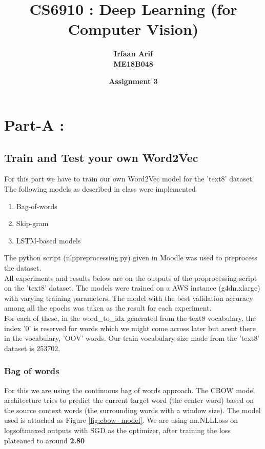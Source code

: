 \documentclass{article}
\title{CS6910 : Deep Learning (for Computer Vision)}
\author{\textbf{Irfaan Arif} \\ {\textbf{ME18B048}}}
\date{\textbf{Assignment 3}}
\begin{document}
\maketitle
\vspace{-1.6em}

\section{Part-A : }
\subsection*{Train and Test your own Word2Vec}

For this part we have to train our own Word2Vec model for the 'text8'  dataset. The following models as described in class were implemented
\begin{enumerate}[label=(\alph*),noitemsep]
    \item Bag-of-words
    \item Skip-gram
    \item LSTM-based models
\end{enumerate}
The python script (nlppreprocessing.py) given in Moodle was used to preprocess the dataset.\\

\noindent
 All experiments and results below are on the outputs of the proprocessing script on the 'text8' dataset. The models were trained on a AWS instance (g4dn.xlarge)  with varying training parameters. The model with the best validation accuracy among all the epochs was taken as the result for each experiment. \\

\noindent
For each of these, in the word\_to\_idx generated from the text8 vocabulary, the index '0' is reserved for words which we might come across later but arent there in the vocabulary, 'OOV' words. Our train vocabulary size made from the 'text8' dataset is 253702.

\subsubsection*{Bag of words}
For this we are using the continuous bag of words approach. The CBOW model architecture tries to predict the current target word (the center word) based on the source context words (the surrounding words with a window size). The model used is attached as Figure \ref{fig:cbow_model}. We are using nn.NLLLoss on logsoftmaxed outputs with SGD as the optimizer, after training the loss plateaued to around \textbf{2.80}
\end{document}
